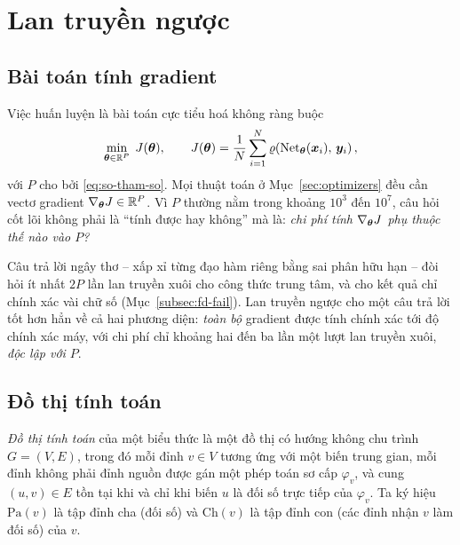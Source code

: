 \section{Lan truyền ngược}
\label{sec:backprop}
 
\subsection{Bài toán tính gradient}
\label{subsec:bai-toan-gradient}
 
Việc huấn luyện là bài toán cực tiểu hoá không ràng buộc
\begin{equation}
\min_{\bm{\theta} \in \mathbb{R}^P} \; J(\bm{\theta}),
\qquad
J(\bm{\theta}) = \frac{1}{N}\sum_{i=1}^{N}
  \varrho\!\left( \operatorname{Net}_{\bm{\theta}}(\bm{x}_i),\, \bm{y}_i \right),
\label{eq:erm}
\end{equation}
với $P$ cho bởi \eqref{eq:so-tham-so}. Mọi thuật toán ở Mục~\ref{sec:optimizers}
đều cần vectơ gradient $\nabla_{\bm{\theta}} J \in \mathbb{R}^P$. Vì $P$ thường nằm trong
khoảng $10^3$ đến $10^7$, câu hỏi cốt lõi không phải là ``tính được hay không''
mà là: \emph{chi phí tính $\nabla_{\bm{\theta}} J$ phụ thuộc thế nào vào $P$?}
 
Câu trả lời ngây thơ -- xấp xỉ từng đạo hàm riêng bằng sai phân hữu hạn -- đòi
hỏi ít nhất $2P$ lần lan truyền xuôi cho công thức trung tâm, và cho kết quả chỉ
chính xác vài chữ số (Mục~\ref{subsec:fd-fail}). Lan truyền ngược cho một câu trả
lời tốt hơn hẳn về cả hai phương diện: \emph{toàn bộ} gradient được tính chính
xác tới độ chính xác máy, với chi phí chỉ khoảng hai đến ba lần một lượt lan
truyền xuôi, \emph{độc lập với $P$}.
 
\subsection{Đồ thị tính toán}
\label{subsec:comp-graph}
 
\begin{definition}
\label{def:comp-graph}
\emph{Đồ thị tính toán} của một biểu thức là một đồ thị có hướng không chu trình
$G = (V,E)$, trong đó mỗi đỉnh $v \in V$ tương ứng với một biến trung gian, mỗi
đỉnh không phải đỉnh nguồn được gán một phép toán sơ cấp $\varphi_v$, và cung
$(u,v) \in E$ tồn tại khi và chỉ khi biến $u$ là đối số trực tiếp của
$\varphi_v$. Ta ký hiệu $\mathrm{Pa}(v)$ là tập đỉnh cha (đối số) và
$\mathrm{Ch}(v)$ là tập đỉnh con (các đỉnh nhận $v$ làm đối số) của $v$.
\end{definition}
 
